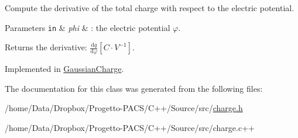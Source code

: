 Compute the derivative of the total charge with respect to the electric potential. 


\begin{DoxyParams}[1]{Parameters}
\mbox{\tt in}  & {\em phi} & \-: the electric potential $ \varphi $. \\
\hline
\end{DoxyParams}
\begin{DoxyReturn}{Returns}
the derivative\-: $ \frac{\mathrm{d}q}{\mathrm{d}\varphi} \left[ C \cdot V^{-1} \right] $. 
\end{DoxyReturn}


Implemented in \hyperlink{classGaussianCharge_a93bfdcacb3bd72aa196771816ee24ab4}{Gaussian\-Charge}.



The documentation for this class was generated from the following files\-:\begin{DoxyCompactItemize}
\item 
/home/\-Data/\-Dropbox/\-Progetto-\/\-P\-A\-C\-S/\-C++/\-Source/src/\hyperlink{charge_8h}{charge.\-h}\item 
/home/\-Data/\-Dropbox/\-Progetto-\/\-P\-A\-C\-S/\-C++/\-Source/src/charge.\-c++\end{DoxyCompactItemize}
